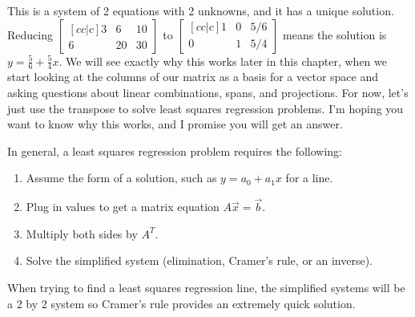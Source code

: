 \begin{example}
This is a system of 2 equations with 2 unknowns, and it has a unique solution.  
Reducing $\begin{bmatrix}[cc|c]3&6&10\\6&20&30\end{bmatrix}$ to $\begin{bmatrix}[cc|c]1&0&5/6\\0&1&5/4\end{bmatrix}$ means the solution is $y=\frac{5}{6}+\frac{5}{4}x.$  
We will see exactly why this works later in this chapter, when we start looking at the columns of our matrix as a basis for a vector space and asking questions about linear combinations, spans, and projections.   
For now, let's just use the transpose to solve least squares regression problems. I'm hoping you want to know why this works, and I promise you will get an answer. 
\end{example}

In general, a least squares regression problem requires the following:
\begin{enumerate}
	\item Assume the form of a solution, such as $y=a_0+a_1x$ for a line. 
	\item Plug in values to get a matrix equation $A\vec x=\vec b$. 
	\item Multiply both sides by $A^T$.
	\item Solve the simplified system (elimination, Cramer's rule, or an inverse). 
\end{enumerate}
When trying to find a least squares regression line, the simplified systems will be a 2 by 2 system so Cramer's rule provides an extremely quick solution. 

